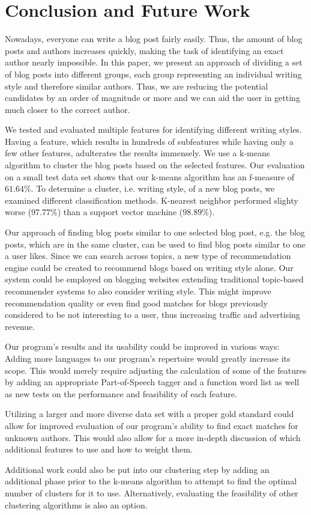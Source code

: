 \section{Conclusion and Future Work}
\label{sec:conclusion}


Nowadays, everyone can write a blog post fairly easily.
Thus, the amount of blog posts and authors increases quickly, making the task of identifying an exact author nearly impossible.
In this paper, we present an approach of dividing a set of blog posts into different groups, each group representing an individual writing style and therefore similar authors.
Thus, we are reducing the potential candidates by an order of magnitude or more and we can aid the user in getting much closer to the correct author.


We tested and  evaluated multiple features for identifying different writing styles.
Having a feature, which results in hundreds of subfeatures while having only a few other features, adulterates the results immensely.
We use a k-means algorithm to cluster the blog posts based on the selected features.
Our evaluation on a small test data set shows that our k-means algorithm has an f-measure of $61.64\%$.
To determine a cluster, i.e. writing style, of a new blog posts, we examined different classification methods.
K-nearest neighbor performed slighty worse ($97.77\%$) than a support vector machine ($98.89\%$).


Our approach of finding blog posts similar to one selected blog post, e.g. the blog posts, which are in the same cluster, can be used to find blog posts similar to one a user likes.
Since we can search across topics, a new type of recommendation engine could be created to recommend blogs based on writing style alone.
Our system could be employed on blogging websites extending traditional  topic-based recommender systems to also consider writing style.
This might improve recommendation quality or even find good matches for blogs previously considered to be not interesting to a user, thus increasing traffic and advertising revenue.


Our program's results and its usability could be improved in various ways: Adding more languages to our program’s repertoire would greatly increase its scope.
This would merely require adjusting the calculation of some of the features by adding an appropriate Part-of-Speech tagger and a function word list as well as new tests on the performance and feasibility of each feature.


Utilizing a larger and more diverse data set with a proper gold standard could allow for improved evaluation of our program’s ability to find exact matches for unknown authors.
This would also allow for a more in-depth discussion of which additional features to use and how to weight them.


Additional work could also be put into our clustering step by adding an additional phase prior to the k-means algorithm to attempt to find the optimal number of clusters for it to use.
Alternatively, evaluating the feasibility of other clustering algorithms is also an option.